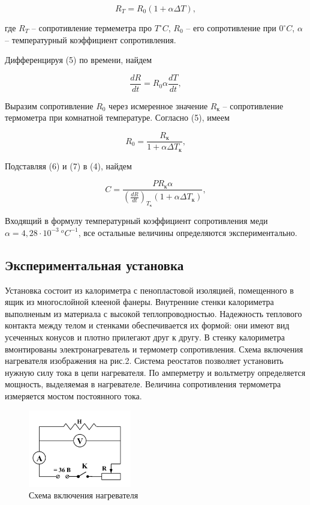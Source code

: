 \documentclass[a4paper, 12pt]{article}
\begin{document}
    \begin{equation}
        R_{T} = R_{0}(1 + \alpha \Delta T),
        \label{RT}
    \end{equation}

    где $R_{T}$ -- сопротивление термеметра про $T  ^{\circ}C$, $R_{0}$ -- его сопротивление при $0  ^{\circ}C$, $\alpha$ -- температурный коэффициент сопротивления.

    Дифференцируя (5) по времени, найдем

    \begin{equation}
        \frac{dR}{dt} = R_{0}\alpha \frac{dT}{dt},
        \label{dRT}
    \end{equation}

    Выразим сопротивление $R_{0}$ через исмеренное значение $R_{\text{к}}$ -- сопротивление термометра при комнатной температуре. Согласно (5), имеем

    \begin{equation}
        R_{0} = \frac{R_{\text{к}}}{1 + \alpha \Delta T_{\text{к}}},
        \label{R0}
    \end{equation}

    Подставляя (6) и (7) в (4), найдем

    \begin{equation}
        C = \frac{PR_{\text{к}} \alpha}{(\frac{dR}{dt})_{T_{\text{к}}}(1 + \alpha \Delta T_{\text{к}})},
        \label{capacity}
    \end{equation}

    Входящий в формулу температурный коэффициент сопротивления меди $\alpha = 4,28 \cdot 10^{-3}~{^oC}^{-1}$, все остальные величины определяются экспериментально.

    \subsection*{Экспериментальная установка}

    Установка состоит из калориметра с пенопластовой изоляцией, помещенного в ящик из многослойной клееной фанеры. Внутренние стенки калориметра выполненым из материала с высокой теплопроводностью. Надежность теплового контакта между телом и стенками обеспечивается их формой: они имеют вид усеченных конусов и плотно прилегают друг к другу. В стенку калориметра вмонтированы электронагреватель и термометр сопротивления. Схема включения нагревателя изображения на рис.2. Система реостатов позволяет установить нужную силу тока в цепи нагревателя. По амперметру и вольтметру определяется мощность, выделяемая в нагревателе. Величина сопротивления термометра измеряется мостом постоянного тока.

    \begin{figure}[!h]
        \centering
        \includegraphics[width=0.4\textwidth]{"img/heater.png"}
        \caption{Схема включения нагревателя}
        \label{fig:boiler}
    \end{figure}
\end{document}
